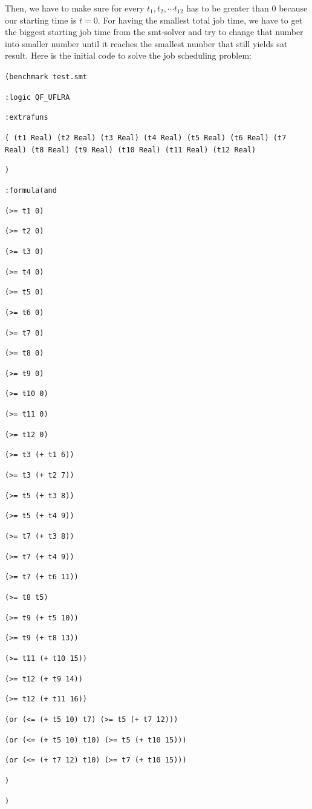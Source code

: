 \documentclass[12pt]{article}
\begin{document}
Then, we have to make sure for every $t_1, t_2, \cdots t_12$ has to be greater than 0 because our starting time is $t=0$. For having the smallest total job time, we have to get the biggest starting job time from the smt-solver and try to change that number into smaller number until it reaches the smallest number that still yields sat result. Here is the initial code to solve the job scheduling problem: 
{\footnotesize

{\tt (benchmark test.smt }

{\tt :logic QF\_UFLRA }

{\tt :extrafuns }

{\tt ( (t1 Real) (t2 Real) (t3 Real) (t4 Real) (t5 Real) (t6 Real) (t7 Real) (t8 Real) (t9 Real) (t10 Real) (t11 Real) (t12 Real) }

{\tt ) }

{\tt :formula(and  }

{\tt (>= t1 0) }

{\tt (>= t2 0) }

{\tt (>= t3 0) }

{\tt (>= t4 0) }

{\tt (>= t5 0) }

{\tt (>= t6 0) }

{\tt (>= t7 0) }

{\tt (>= t8 0) }

{\tt (>= t9 0) }

{\tt (>= t10 0) }

{\tt (>= t11 0) }

{\tt (>= t12 0) }

{\tt (>= t3 (+ t1 6)) }

{\tt (>= t3 (+ t2 7)) }

{\tt (>= t5 (+ t3 8)) }

{\tt (>= t5 (+ t4 9)) }

{\tt (>= t7 (+ t3 8)) }

{\tt (>= t7 (+ t4 9)) }

{\tt (>= t7 (+ t6 11)) }

{\tt (>= t8 t5) }

{\tt (>= t9 (+ t5 10)) }

{\tt (>= t9 (+ t8 13)) }

{\tt (>= t11 (+ t10 15)) }

{\tt (>= t12 (+ t9 14)) }

{\tt (>= t12 (+ t11 16)) }

{\tt (or (<= (+ t5 10) t7) (>= t5 (+ t7 12))) }

{\tt (or (<= (+ t5 10) t10) (>= t5 (+ t10 15))) }

{\tt (or (<= (+ t7 12) t10) (>= t7 (+ t10 15))) }

{\tt  }

{\tt   }

{\tt  }

{\tt ) }

{\tt  }

{\tt ) }
	
}
\end{document}

